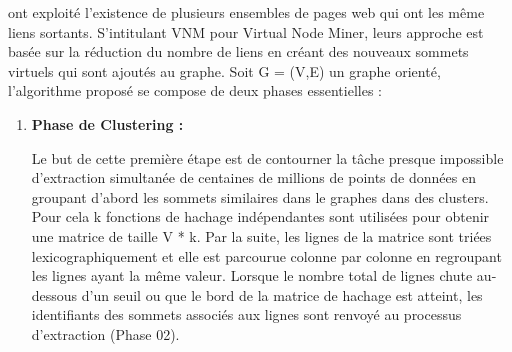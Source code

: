 				\citep{buehrer2008scalable} ont exploité l'existence de plusieurs ensembles de pages web qui ont les même liens sortants. S'intitulant  VNM pour Virtual Node Miner, leurs approche est basée sur la réduction du nombre de liens en créant des nouveaux sommets virtuels qui sont ajoutés au graphe. Soit G = (V,E) un graphe orienté, l'algorithme proposé se compose de deux phases essentielles :
				\begin{enumerate}
				
				
					\item \textbf{Phase de Clustering :}
					
					Le but de cette première étape est de contourner la tâche presque impossible d'extraction simultanée de centaines de millions de points de données en groupant d'abord les sommets similaires dans le graphes dans des clusters. 
				Pour cela k fonctions de hachage indépendantes sont utilisées pour obtenir une matrice de taille V * k. Par la suite, les lignes de la matrice  sont triées lexicographiquement
				et elle est parcourue colonne par colonne en regroupant les lignes ayant la même valeur. Lorsque le nombre total de lignes chute au-dessous d'un seuil ou que le bord de la matrice de hachage est atteint, les identifiants des sommets associés aux lignes sont renvoyé au processus d'extraction (Phase 02). 
					

\end{enumerate}
